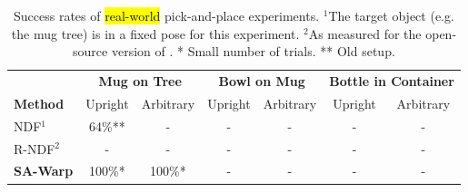 \documentclass{article}
\newcommand{\ob}[1]{\textcolor{purple}{[\textbf{OB:} #1]}}
\begin{document}

\begin{table}[t!]
    \centering
    \begin{tabular}{lcccccc}
        \toprule
          & \multicolumn{2}{c}{\textbf{Mug on Tree}} & \multicolumn{2}{c}{\textbf{Bowl on Mug}} & \multicolumn{2}{c}{\textbf{Bottle in Container}} \\
         \textbf{Method} & Upright & Arbitrary & Upright & Arbitrary & Upright & Arbitrary \\
         \midrule
         NDF$^1$ & 64\%** & - & - & - & - & - \\
         R-NDF$^2$ & - & - & - & - & - & - \\
         \textbf{SA-Warp} & 100\%* & 100\%* & - & - & - & - \\
         \bottomrule
    \end{tabular}
    \caption{Success rates of \hl{real-world} pick-and-place experiments. $^1$The target object (e.g. the mug tree) is in a fixed pose for this experiment. $^2$As measured for the open-source version of \citet{simeonov22Neurala}. * Small number of trials. ** Old setup.}
    \label{tab:real_world}
\end{table}
\end{document}
